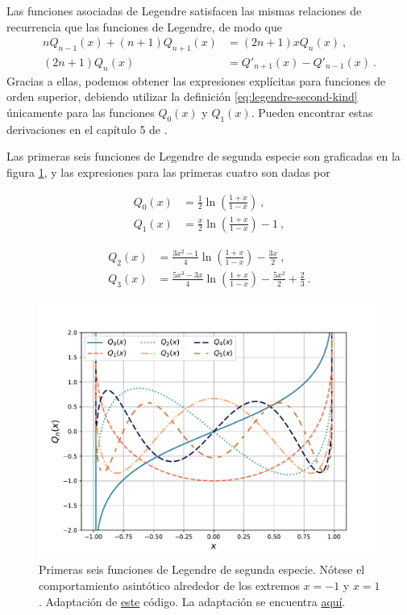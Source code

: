 Las funciones asociadas de Legendre satisfacen las mismas relaciones de recurrencia que las funciones de Legendre, de modo que
\begin{align}
    nQ_{n-1}(x) + (n+1)Q_{n+1}(x) & = (2n+1) x Q_n(x) \ , \\
    (2n+1)Q_n(x) & = Q'_{n+1}(x) - Q'_{n-1}(x) \ . 
\end{align}
Gracias a ellas, podemos obtener las expresiones explícitas para funciones de orden superior, debiendo utilizar la definición \eqref{eq:legendre-second-kind} únicamente para las funciones $Q_0(x)$ y $Q_1(x)$. Pueden encontrar estas derivaciones en el capítulo 5 de \cite{Rubilar}.

Las primeras seis funciones de Legendre de segunda especie son graficadas en la figura \ref{fig:Legendre-second-kind}, y las expresiones para las primeras cuatro son dadas por

\begin{minipage}[b]{.45\textwidth}
    \begin{align*}
        Q_0(x) & = \frac{1}{2} \ln\left( \frac{1+x}{1-x} \right) \ , \\
        Q_1(x) & = \frac{x}{2} \ln\left( \frac{1+x}{1-x} \right) - 1 \ ,
    \end{align*}
\end{minipage}
\hfill
\begin{minipage}[b]{.5\textwidth}
    \begin{align*}
        Q_2(x) & = \frac{3x^2-1}{4}\ln\left( \frac{1+x}{1-x} \right) - \frac{3x}{2} \ , \\
        Q_3(x) & = \frac{5x^3 - 3x}{4}\ln\left( \frac{1+x}{1-x} \right) - \frac{5x^2}{2} + \frac{2}{3} \ . 
    \end{align*}
\end{minipage}

\begin{figure}[htbp]
    \centering
    \includegraphics[width=12cm]{Figuras/Legendre-second-kind.pdf}
    \caption{Primeras seis funciones de Legendre de segunda especie. Nótese el comportamiento asintótico alrededor de los extremos $x = -1$ y $x=1$. Adaptación de \href{https://github.com/gfrubi/FM2/blob/master/figuras-editables/fig-Legendre.py}{este} código. La adaptación se encuentra \href{https://github.com/Pedroga-cc/Fisica-Matematica-II/blob/main/Figuras/Plotter_Legendre.py}{aquí}.}
    \label{fig:Legendre-second-kind}
\end{figure}

